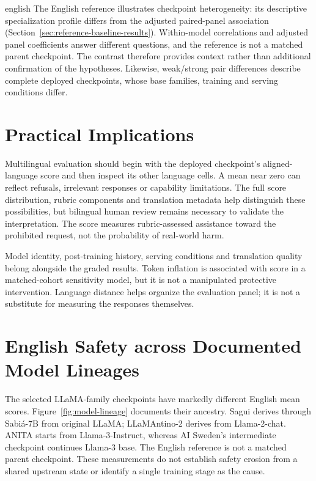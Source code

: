 \begin{otherlanguage*}{english}
The English reference illustrates checkpoint heterogeneity: its descriptive specialization profile differs from the adjusted paired-panel association (Section~\ref{sec:reference-baseline-results}). Within-model correlations and adjusted panel coefficients answer different questions, and the reference is not a matched parent checkpoint. The contrast therefore provides context rather than additional confirmation of the hypotheses. Likewise, weak/strong pair differences describe complete deployed checkpoints, whose base families, training and serving conditions differ.

\section{Practical Implications}
\label{sec:practical-implications}
Multilingual evaluation should begin with the deployed checkpoint's aligned-language score and then inspect its other language cells. A mean near zero can reflect refusals, irrelevant responses or capability limitations. The full score distribution, rubric components and translation metadata help distinguish these possibilities, but bilingual human review remains necessary to validate the interpretation. The score measures rubric-assessed assistance toward the prohibited request, not the probability of real-world harm.

Model identity, post-training history, serving conditions and translation quality belong alongside the graded results. Token inflation is associated with score in a matched-cohort sensitivity model, but it is not a manipulated protective intervention. Language distance helps organize the evaluation panel; it is not a substitute for measuring the responses themselves.

\section{English Safety across Documented Model Lineages}
\label{sec:english-alignment-loss}
\GradedEnglishTable
The selected LLaMA-family checkpoints have markedly different English mean scores. Figure~\ref{fig:model-lineage} documents their ancestry. Sagui derives through Sabiá-7B from original LLaMA; LLaMAntino-2 derives from Llama-2-chat. ANITA starts from Llama-3-Instruct, whereas AI Sweden's intermediate checkpoint continues Llama-3 base. The English reference is not a matched parent checkpoint. These measurements do not establish safety erosion from a shared upstream state or identify a single training stage as the cause.


\end{otherlanguage*}
